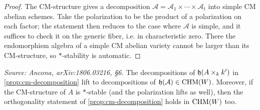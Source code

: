 \begin{proof}
  The CM-structure gives a decomposition
  \(\mathcal{A} = \mathcal{A}_1 \times \cdots \times \mathcal{A}_t\) into simple
  CM abelian schemes. Take the polarization to be the product of a polarization
  on each factor; the statement then reduces to the case where \(\mathcal{A}\) is
  simple, and it suffices to check it on the generic fiber, i.e. in
  characteristic zero. There the endomorphism algebra of a simple CM abelian
  variety cannot be larger than its CM-structure, so \(*\)-stability is
  automatic.
\end{proof}

\begin{corollary}
  \label{cor:lifting-motives}
  \textit{Source: Ancona, arXiv:1806.03216, §6.}
  The decompositions of \(\mathfrak{h}(A \times_k k')\) in \cref{prop:cm-decomposition}
  lift to decompositions of \(\mathfrak{h}(\mathcal{A}) \in \mathrm{CHM}(W)\). Moreover, if the
  CM-structure of \(A\) is \(*\)-stable (and the polarization lifts as well),
  then the orthogonality statement of \cref{prop:cm-decomposition} holds in
  \(\mathrm{CHM}(W)\) too.
\end{corollary}

